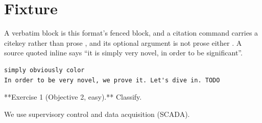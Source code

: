 \section{Fixture}
A verbatim block is this format's fenced block, and a citation command
carries a citekey rather than prose \citep{smith_simply_2020}, and its
optional argument is not prose either \citet[a very novel proof, in order to
prove it]{jones_novel_2021}. A source quoted inline says ``it is simply
very novel, in order to be significant''.
\begin{verbatim}
simply obviously color
In order to be very novel, we prove it. Let's dive in. TODO
\end{verbatim}
\begin{center}
\centering
\color{red}
\end{center}

**Exercise 1 (Objective 2, easy).** Classify.

We use supervisory control and data acquisition (SCADA).
